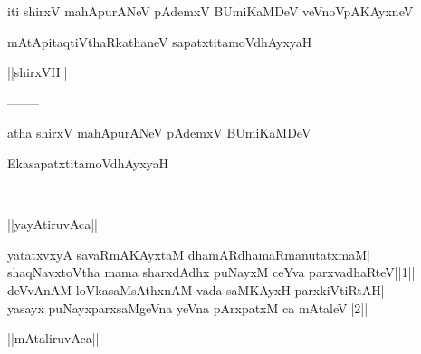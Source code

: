\documentclass{article}
\begin{document}
\begin{center}
iti shirxV mahApurANeV pAdemxV BUmiKaMDeV veVnoVpAKAyxneV
\end{center}

\begin{center}
mAtApitaqtiVthaRkathaneV sapatxtitamoVdhAyxyaH
\end{center}

\begin{center}
||shirxVH||
\end{center}

\begin{center}
--------
\end{center}

\begin{center}
atha shirxV mahApurANeV pAdemxV BUmiKaMDeV
\end{center}

\begin{center}
EkasapatxtitamoVdhAyxyaH
\end{center}

\begin{center}

---------------
\end{center}

\begin{center}
||yayAtiruvAca||
\end{center}

yatatxvxyA savaRmAKAyxtaM dhamARdhamaRmanutatxmaM|\\
shaqNavxtoVtha mama sharxdAdhx puNayxM ceYva parxvadhaRteV||1||\\
deVvAnAM loVkasaMsAthxnAM vada saMKAyxH parxkiVtiRtAH|\\
yasayx puNayxparxsaMgeVna yeVna pArxpatxM ca mAtaleV||2||\\

\begin{center}
||mAtaliruvAca||
\end{center}
\end{document}
